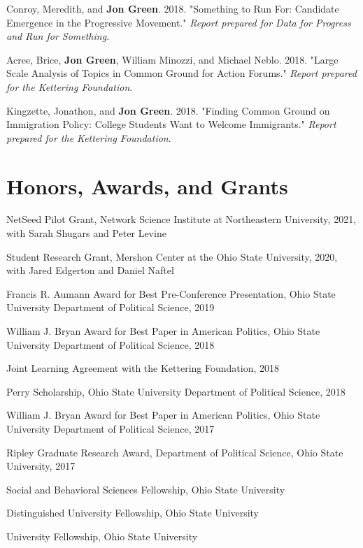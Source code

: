 \documentclass[letterpaper]{article}
\renewenvironment{itemize}{
  \begin{list}{}{
    \setlength{\leftmargin}{1.5em}
  }
}{
  \end{list}
}
\begin{document}
\begin{itemize}
\item Conroy, Meredith, and \textbf{Jon Green}. 2018. "Something to Run For: Candidate Emergence in the Progressive Movement." \textit{Report prepared for Data for Progress and Run for Something.}

\item Acree, Brice, \textbf{Jon Green}, William Minozzi, and Michael Neblo. 2018. "Large Scale Analysis of Topics in Common Ground for Action Forums." \textit{Report prepared for the Kettering Foundation}.

\item Kingzette, Jonathon, and \textbf{Jon Green}. 2018. "Finding Common Ground on Immigration Policy: College Students Want to Welcome Immigrants." \textit{Report prepared for the Kettering Foundation}.
\end{itemize}

\section*{Honors, Awards, and Grants}

\begin{itemize}

\item NetSeed Pilot Grant, Network Science Institute at Northeastern University, 2021, with Sarah Shugars and Peter Levine

\item Student Research Grant, Mershon Center at the Ohio State University, 2020, with Jared Edgerton and Daniel Naftel

\item Francis R. Aumann Award for Best Pre-Conference Presentation, Ohio State University Department of Political Science, 2019

\item William J. Bryan Award for Best Paper in American Politics, Ohio State University Department of Political Science, 2018

\item Joint Learning Agreement with the Kettering Foundation, 2018

\item Perry Scholarship, Ohio State University Department of Political Science, 2018

\item William J. Bryan Award for Best Paper in American Politics, Ohio State University Department of Political Science, 2017

\item Ripley Graduate Research Award, Department of Political Science, Ohio State University, 2017

\item Social and Behavioral Sciences Fellowship, Ohio State University

\item Distinguished University Fellowship, Ohio State University

\item University Fellowship, Ohio State University
\end{itemize}
\end{document}

